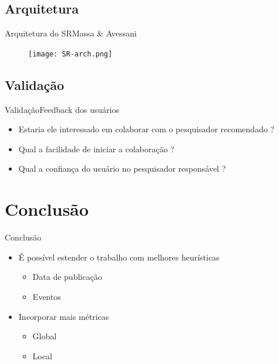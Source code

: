 \documentclass{beamer}
\begin{document}
\subsection{Arquitetura}

\begin{frame}{Arquitetura do SR}{Massa \& Avessani}
  \begin{figure}[ht]
    \texttt{[image: SR-arch.png]}
    \label{fig:sr-arch}
  \end{figure}
\end{frame}

\subsection{Validação}

\begin{frame}{Validação}{Feedback dos usuários}
  \begin{itemize}
    \item Estaria ele interessado em colaborar com o pesquisador recomendado ?
    \item Qual a facilidade de iniciar a colaboração ?
    \item Qual a confiança do usuário no pesquisador responsável ?  
  \end{itemize}
\end{frame}

\section{Conclusão}

\begin{frame}{Conclusão}{}
  \begin{itemize}
    \item É possível estender o trabalho com melhores heurísticas
    \begin{itemize}
      \item Data de publicação
      \item Eventos
    \end{itemize}
    \item Incorporar mais métricas  
    \begin{itemize}
      \item Global
      \item Local
    \end{itemize}
  \end{itemize}
\end{frame}

\section{}

\begin{frame}
  \titlepage
\end{frame}
\end{document}
